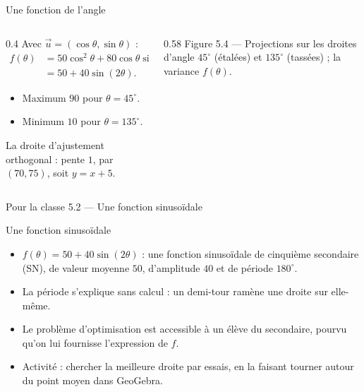 \begin{frame}{Une fonction de l'angle}
  \begin{columns}[c]
    \begin{column}{0.4\textwidth}
      \small Avec $\vec u=(\cos\theta,\sin\theta)$ :
      \begin{align*}
        f(\theta)&=50\cos^2\theta+80\cos\theta\sin\theta+50\sin^2\theta\\
                 &=50+40\sin(2\theta).
      \end{align*}
      \begin{itemize}
        \item Maximum $90$ pour $\theta=45^\circ$.
        \item Minimum $10$ pour $\theta=135^\circ$.
      \end{itemize}
      La droite d'ajustement orthogonal : pente $1$, par $(70,75)$, soit
      $y=x+5$.
    \end{column}
    \begin{column}{0.58\textwidth}
      \scriptsize Figure 5.4 --- Projections sur les droites d'angle
      $45^\circ$ (étalées) et $135^\circ$ (tassées) ; la variance $f(\theta)$.
    \end{column}
  \end{columns}
\end{frame}

\begin{frame}{Pour la classe 5.2 --- Une fonction sinusoïdale}
  \begin{Classe}{Une fonction sinusoïdale}
    \begin{itemize}
      \item $f(\theta)=50+40\sin(2\theta)$ : une fonction sinusoïdale de
        cinquième secondaire (SN), de valeur moyenne $50$, d'amplitude $40$
        et de période $180^\circ$.
      \item La période s'explique sans calcul : un demi-tour ramène une
        droite sur elle-même.
      \item Le problème d'optimisation est accessible à un élève du
        secondaire, pourvu qu'on lui fournisse l'expression de $f$.
      \item Activité : chercher la meilleure droite par essais, en la faisant
        tourner autour du point moyen dans GeoGebra.
    \end{itemize}
  \end{Classe}
\end{frame}

